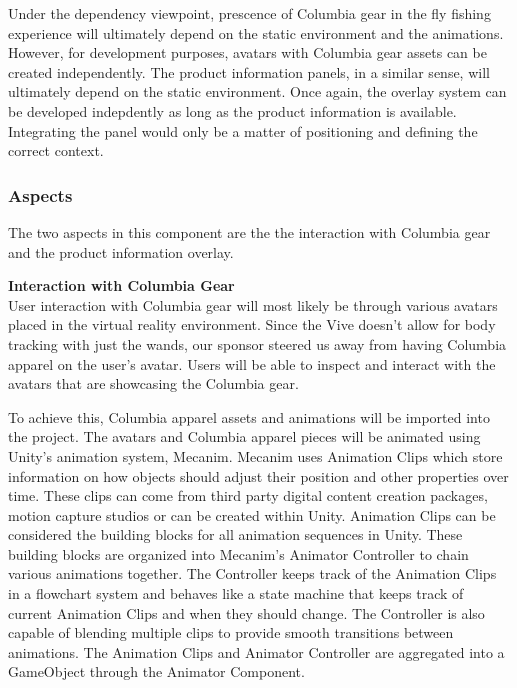 \documentclass[10pt,journal,compsoc,onecolumn, draftclsnofoot]{IEEEtran}
\begin{document}
Under the dependency viewpoint, prescence of Columbia gear in the fly fishing experience will ultimately depend on the static environment and the animations. However, for development purposes, avatars with Columbia gear assets can be created independently. The product information panels, in a similar sense, will ultimately depend on the static environment. Once again, the overlay system can be developed indepdently as long as the product information is available. Integrating the panel would only be a matter of positioning and defining the correct context.

\subsubsection{Aspects}
The two aspects in this component are the the interaction with Columbia gear and the product information overlay.

\hangindent=0.5cm \textbf{Interaction with Columbia Gear} \\
User interaction with Columbia gear will most likely be through various avatars placed in the virtual reality environment. Since the Vive doesn't allow for body tracking with just the wands, our sponsor steered us away from having Columbia apparel on the user's avatar. Users will be able to inspect and interact with the avatars that are showcasing the Columbia gear.

To achieve this, Columbia apparel assets and animations will be imported into the project. The avatars and Columbia apparel pieces will be animated using Unity's animation system, Mecanim. Mecanim uses Animation Clips which store information on how objects should adjust their position and other properties over time. These clips can come from third party digital content creation packages, motion capture studios or can be created within Unity. Animation Clips can be considered the building blocks for all animation sequences in Unity. These building blocks are organized into Mecanim's Animator Controller to chain various animations together. The Controller keeps track of the Animation Clips in a flowchart system and behaves like a state machine that keeps track of current Animation Clips and when they should change. The Controller is also capable of blending multiple clips to provide smooth transitions between animations. The Animation Clips and Animator Controller are aggregated into a GameObject through the Animator Component.\cite{unity_animation} \\
\end{document}
